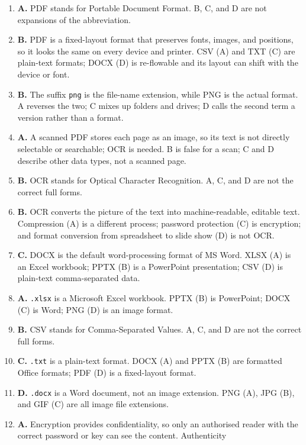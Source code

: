 \begin{enumerate}[label=\textbf{Q\arabic*.}, leftmargin=*]
\item \textbf{A.} PDF stands for Portable Document Format. B, C, and D are
  not expansions of the abbreviation.
\item \textbf{B.} PDF is a fixed-layout format that preserves fonts, images,
  and positions, so it looks the same on every device and printer. CSV (A)
  and TXT (C) are plain-text formats; DOCX (D) is re-flowable and its layout
  can shift with the device or font.
\item \textbf{B.} The suffix \texttt{png} is the file-name extension, while
  PNG is the actual format. A reverses the two; C mixes up folders and
  drives; D calls the second term a version rather than a format.
\item \textbf{A.} A scanned PDF stores each page as an image, so its text is
  not directly selectable or searchable; OCR is needed. B is false for a
  scan; C and D describe other data types, not a scanned page.
\item \textbf{B.} OCR stands for Optical Character Recognition. A, C, and D
  are not the correct full forms.
\item \textbf{B.} OCR converts the picture of the text into machine-readable,
  editable text. Compression (A) is a different process; password protection
  (C) is encryption; and format conversion from spreadsheet to slide show (D)
  is not OCR.
\item \textbf{C.} DOCX is the default word-processing format of MS Word.
  XLSX (A) is an Excel workbook; PPTX (B) is a PowerPoint presentation; CSV
  (D) is plain-text comma-separated data.
\item \textbf{A.} \texttt{.xlsx} is a Microsoft Excel workbook. PPTX (B) is
  PowerPoint; DOCX (C) is Word; PNG (D) is an image format.
\item \textbf{B.} CSV stands for Comma-Separated Values. A, C, and D are not
  the correct full forms.
\item \textbf{C.} \texttt{.txt} is a plain-text format. DOCX (A) and PPTX (B)
  are formatted Office formats; PDF (D) is a fixed-layout format.
\item \textbf{D.} \texttt{.docx} is a Word document, not an image extension.
  PNG (A), JPG (B), and GIF (C) are all image file extensions.
\item \textbf{A.} Encryption provides confidentiality, so only an authorised
  reader with the correct password or key can see the content. Authenticity

\end{enumerate}
